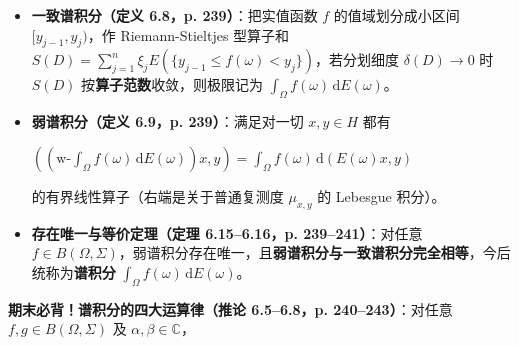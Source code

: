 \documentclass[11pt,a4paper]{article}
\providecommand{\tightlist}{\setlength{\itemsep}{2pt}\setlength{\parskip}{0pt}}
\newcommand{\FitDisplayMath}[1]{%
  \par\vspace{4.5pt}\noindent
  \begin{adjustbox}{max width=\linewidth, center}
    $\displaystyle #1$
  \end{adjustbox}
  \par\vspace{4.5pt}%
}
\begin{document}
\begin{itemize}
\tightlist
\item
  \textbf{一致谱积分（定义 6.8，p. 239）}：把实值函数 \(f\) 的值域划分成小区间 \([y_{j-1}, y_j)\)，作 Riemann-Stieltjes 型算子和 \(S(D) = \sum_{j=1}^n \xi_j E(\{y_{j-1} \le f(\omega) < y_j\})\)，若分划细度 \(\delta(D) \to 0\) 时 \(S(D)\) 按\textbf{算子范数}收敛，则极限记为 \(\int_\Omega f(\omega)\,\mathrm{d}E(\omega)\)。
\item
  \textbf{弱谱积分（定义 6.9，p. 239）}：满足对一切 \(x, y \in H\) 都有 
\FitDisplayMath{\left(\left(\mathrm{w\text{-}}\int_\Omega f(\omega)\,\mathrm{d}E(\omega)\right)x, y\right) = \int_\Omega f(\omega)\,\mathrm{d}(E(\omega)x, y)}
 的有界线性算子（右端是关于普通复测度 \(\mu_{x,y}\) 的 Lebesgue 积分）。
\item
  \textbf{存在唯一与等价定理（定理 6.15--6.16，p. 239--241）}：对任意 \(f \in B(\Omega, \Sigma)\)，弱谱积分存在唯一，且\textbf{弱谱积分与一致谱积分完全相等}，今后统称为\textbf{谱积分} \(\int_\Omega f(\omega)\,\mathrm{d}E(\omega)\)。
\end{itemize}

\textbf{期末必背！谱积分的四大运算律（推论 6.5--6.8，p. 240--243）}：对任意 \(f, g \in B(\Omega, \Sigma)\) 及 \(\alpha, \beta \in \mathbb{C}\)，
\end{document}
